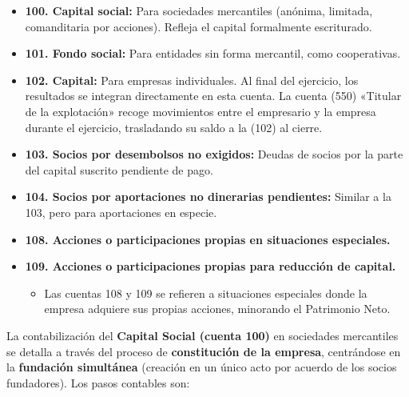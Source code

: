 \documentclass[
  paper=a4,
  ,captions=tableheading
]{scrbook}
\providecommand{\tightlist}{%
  \setlength{\itemsep}{0pt}\setlength{\parskip}{0pt}}
\begin{document}
\begin{itemize}
\tightlist
\item
  \textbf{100. Capital social:} Para sociedades mercantiles (anónima,
  limitada, comanditaria por acciones). Refleja el capital formalmente
  escriturado.
\item
  \textbf{101. Fondo social:} Para entidades sin forma mercantil, como
  cooperativas.
\item
  \textbf{102. Capital:} Para empresas individuales. Al final del
  ejercicio, los resultados se integran directamente en esta cuenta. La
  cuenta (550) «Titular de la explotación» recoge movimientos entre el
  empresario y la empresa durante el ejercicio, trasladando su saldo a
  la (102) al cierre.
\item
  \textbf{103. Socios por desembolsos no exigidos:} Deudas de socios por
  la parte del capital suscrito pendiente de pago.
\item
  \textbf{104. Socios por aportaciones no dinerarias pendientes:}
  Similar a la 103, pero para aportaciones en especie.
\item
  \textbf{108. Acciones o participaciones propias en situaciones
  especiales.}
\item
  \textbf{109. Acciones o participaciones propias para reducción de
  capital.}

  \begin{itemize}
  \tightlist
  \item
    Las cuentas 108 y 109 se refieren a situaciones especiales donde la
    empresa adquiere sus propias acciones, minorando el Patrimonio Neto.
  \end{itemize}
\end{itemize}

La contabilización del \textbf{Capital Social (cuenta 100)} en
sociedades mercantiles se detalla a través del proceso de
\textbf{constitución de la empresa}, centrándose en la \textbf{fundación
simultánea} (creación en un único acto por acuerdo de los socios
fundadores). Los pasos contables son:
\end{document}
